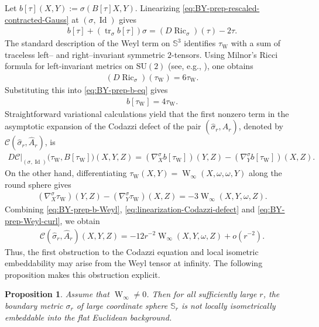 \documentclass[10pt,a4paper]{amsart}
\newcommand{\Sph}{\mathbb{S}}
\newcommand{\tr}{\operatorname{tr}}
\newcommand{\Ric}{\operatorname{Ric}}
\newcommand{\Weyl}{\operatorname{W}}
\newcommand{\Id}{\operatorname{Id}}
\newcommand{\SU}{\mathrm{SU}}
\newtheorem{proposition}[theorem]{Proposition}
\begin{document}
	Let $b[\tau](X,Y):=\sigma(B[\tau]X,Y)$. Linearizing \eqref{eq:BY-prep-rescaled-contracted-Gauss} at
	$(\sigma,\Id)$ gives
	\begin{align}\label{eq:BY-prep-b-eq}
		b[\tau]+(\tr_{\sigma}b[\tau])\sigma
		=
		(D\Ric_{\sigma})(\tau)-2\tau .
	\end{align}
	The standard description of the Weyl term on
	$\Sph^3$ identifies $\tau_{\Weyl}$ with a sum of traceless left-- and
	right--invariant symmetric $2$-tensors. Using Milnor's Ricci formula for
	left-invariant metrics on $\SU(2)$ (see, e.g., \cite{Milnor76}), one obtains
	\begin{align*}
		(D\Ric_{\sigma})(\tau_{\Weyl})
		=
		6\tau_{\Weyl}.
	\end{align*}
	Substituting this into \eqref{eq:BY-prep-b-eq} gives
	\begin{align}\label{eq:BY-prep-b-Weyl}
		b[\tau_{\Weyl}]
		=
		4\tau_{\Weyl}.
	\end{align}
	Straightforward variational calculations yield that the first nonzero term in the asymptotic expansion of the Codazzi defect of the pair
	$(\hat\sigma_r,\hat A_r)$, denoted by $\mathcal C(\hat\sigma_r,\hat A_r)$, is
	\begin{align}\label{eq:linearization-Codazzi-defect}
		D\mathcal C\big|_{(\sigma,\Id)}
		\bigl(\tau_{\Weyl},B[\tau_{\Weyl}]\bigr)(X,Y,Z)
		=
		(\nabla^{\sigma}_X b[\tau_{\Weyl}])(Y,Z)
		-
		(\nabla^{\sigma}_Y b[\tau_{\Weyl}])(X,Z).
	\end{align}
	On the other hand, differentiating
	$\tau_{\Weyl}(X,Y)=\Weyl_\infty(X,\omega,\omega,Y)$ along the round sphere gives
	\begin{align}\label{eq:BY-prep-Weyl-curl}
		(\nabla_X^{\sigma}\tau_{\Weyl})(Y,Z)
		-
		(\nabla_Y^{\sigma}\tau_{\Weyl})(X,Z)
		=
		-3\Weyl_\infty(X,Y,\omega,Z).
	\end{align}
	Combining \eqref{eq:BY-prep-b-Weyl}, \eqref{eq:linearization-Codazzi-defect} and \eqref{eq:BY-prep-Weyl-curl}, we obtain
	\begin{align}\label{eq:BY-prep-Weyl-Codazzi-defect}
		\mathcal C(\hat\sigma_r,\hat A_r)(X,Y,Z)
		=
		-12r^{-2}\Weyl_\infty(X,Y,\omega,Z)
		+
		o(r^{-2}).
	\end{align}
	Thus, the first obstruction to the Codazzi equation and local isometric embeddability may arise from the Weyl tensor at infinity. The following proposition makes this obstruction explicit.
	
	\begin{proposition}\label{prop:BY-Weyl-obstruction-LW}
		Assume that $\Weyl_\infty\neq 0$. Then for all sufficiently large $r$, the
		boundary metric $\sigma_r$ of large coordinate sphere $\Sph_r$ is not locally isometrically embeddable into the flat Euclidean background.
	\end{proposition}
	
\end{document}
